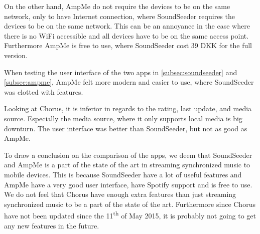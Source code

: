 On the other hand, AmpMe do not require the devices to be on the same network, only to have Internet connection,
where SoundSeeder requires the devices to be on the same network.
This can be an annoyance in the case where there is no WiFi accessible and all devices have to be on the same access point.
Furthermore AmpMe is free to use, where SoundSeeder cost 39 DKK for the full version.

When testing the user interface of the two apps in \cref{subsec:soundseeder} and \cref{subsec:ampme}, AmpMe felt more modern and easier to use,
where SoundSeeder was clotted with features.

Looking at Chorus, it is inferior in regards to the rating, last update, and media source.
Especially the media source, where it only supports local media is big downturn. 
The user interface was better than SoundSeeder, but not as good as AmpMe.

To draw a conclusion on the comparison of the apps,
we deem that SoundSeeder and AmpMe is a part of the state of the art in streaming synchronized music to mobile devices. 
This is because SoundSeeder have a lot of useful features and AmpMe have a very good user interface, have Spotify support and is free to use. 
We do not feel that Chorus have enough extra features than just streaming synchronized music to be a part of the state of the art.
Furthermore since Chorus have not been updated since the 11\textsuperscript{th} of May 2015,
it is probably not going to get any new features in the future.

